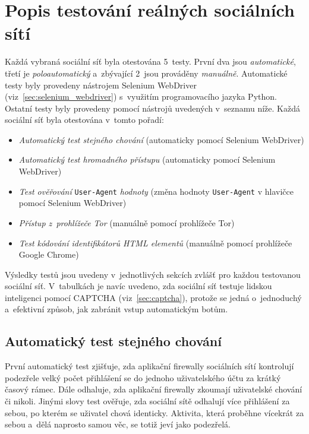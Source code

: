 \section{Popis testování reálných sociálních sítí}
Každá vybraná sociální síť byla otestována 5~testy. První dva jsou \textit{automatické}, třetí je \textit{poloautomatický} a~zbývající 2~jsou prováděny \textit{manuálně}. Automatické testy byly provedeny nástrojem Selenium WebDriver (viz~\ref{sec:selenium_webdriver}) s~využitím programovacího jazyka Python. Ostatní testy byly provedeny pomocí nástrojů uvedených v~seznamu níže. Každá sociální síť byla otestována v~tomto pořadí: 
\begin{itemize}
  \item \textit{Automatický test stejného chování} (automaticky pomocí Selenium WebDriver)
  \item \textit{Automatický test hromadného přístupu} (automaticky pomocí Selenium WebDriver)
  \item \textit{Test ověřování} \texttt{User-Agent} \textit{hodnoty} (změna hodnoty \texttt{User-Agent} v hlavičce pomocí Selenium WebDriver)
  \item \textit{Přístup z~prohlížeče Tor} (manuálně pomocí prohlížeče Tor)
  \item \textit{Test kódování identifikátorů HTML elementů} (manuálně pomocí prohlížeče Google Chrome)
\end{itemize}

\noindent
Výsledky testů jsou uvedeny v~jednotlivých sekcích zvlášť pro každou testovanou sociální síť. V~tabulkách je navíc uvedeno, zda sociální síť testuje lidskou inteligenci pomocí CAPTCHA (viz~\ref{sec:captcha}), protože se jedná o~jednoduchý a~efektivní způsob, jak zabránit vstup automatickým botům.

\subsection*{Automatický test stejného chování}
\label{sec:repeated_behaviour}
První automatický test zjišťuje, zda aplikační firewally sociálních sítí kontrolují podezřele velký počet přihlášení se do jednoho uživatelského účtu za krátký časový rámec. Dále odhaluje, zda aplikační firewally zkoumají uživatelské chování či nikoli. Jinými slovy test ověřuje, zda sociální sítě odhalují více přihlášení za sebou, po kterém se uživatel chová identicky. Aktivita, která proběhne vícekrát za sebou a~dělá naprosto samou věc, se totiž jeví jako podezřelá.

